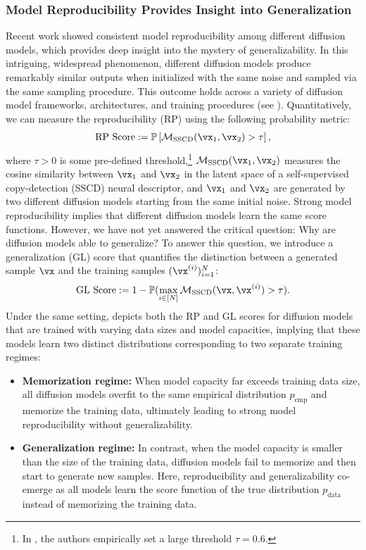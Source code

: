 \documentclass[../../book-main.tex]{subfiles}
\begin{document}
\subsubsection{Model Reproducibility Provides Insight into Generalization}  
Recent work \cite{pmlr-v235-zhang24cn} showed consistent model reproducibility among different diffusion models, which provides deep insight into the mystery of generalizability. In this intriguing, widespread phenomenon, different diffusion models produce remarkably similar outputs when initialized with the same noise and sampled via the same sampling procedure. This outcome holds across a variety of diffusion model frameworks, architectures, and training procedures (see ). Quantitatively, we can measure the reproducibility (RP) using the following probability metric:
\begin{align}
    \text{RP Score} := \mathbb P\left[\mathcal M_{\text{SSCD}}(\vx_1,\vx_2)>\tau\right],
\end{align}
where $\tau>0$ is some pre-defined threshold,\footnote{In \cite{pmlr-v235-zhang24cn}, the authors empirically set a large threshold $\tau =0.6$.} $\mathcal M_{\text{SSCD}}(\vx_1,\vx_2)$ measures the cosine similarity between $\vx_1$ and $\vx_2$ in the latent space of a self-supervised copy-detection (SSCD) neural descriptor, and $\vx_1$ and $\vx_2$ are generated by two different diffusion models starting from the same initial noise. Strong model reproducibility implies that different diffusion models learn the same score functions. However, we have not yet answered the critical question: Why are diffusion models able to generalize? To answer this question, we introduce a generalization (GL) score that quantifies the distinction between a generated sample $\vx$ and the training samples $(\vx^{(i)})_{i=1}^N$:
\begin{align}
    \text{GL Score} := 1- \mathbb P( \max_{i \in [N]} \mathcal M_{\text{SSCD}}(\vx,\vx^{(i)})>\tau).
\end{align}
Under the same setting,  depicts both the RP and GL scores for diffusion models that are trained with varying data sizes and model capacities, implying that these models learn two distinct distributions corresponding to two separate training regimes:
\begin{itemize}
    \item \textbf{Memorization regime:} When model capacity far exceeds training data size, all diffusion models overfit to the same empirical distribution $p_{\text{emp}}$ and memorize the training data, ultimately leading to strong model reproducibility without generalizability.
    \item \textbf{Generalization regime:} In contrast, when the model capacity is smaller than the size of the training data, diffusion models fail to memorize and then start to generate new samples. Here, reproducibility and generalizability co-emerge as all models learn the score function of the true distribution $p_{\text{data}}$ instead of memorizing the training data.
\end{itemize}
\end{document}
